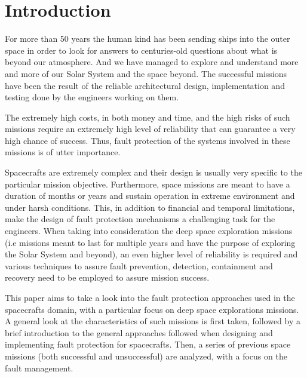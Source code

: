 \section{Introduction}
For more than 50 years the human kind has been sending ships into the outer
space in order to look for answers to centuries-old questions about what is
beyond our atmosphere. And we have managed to explore and understand more and
more of our Solar System and the space beyond. The successful missions have been
the result of the reliable architectural design, implementation and testing done
by the engineers working on them.

The extremely high costs, in both money and time, and the high risks of such
missions require an extremely high level of reliability that can guarantee a
very high chance of success. Thus, fault protection of the systems involved in
these missions is of utter importance.

Spacecrafts are extremely complex and their design is usually very specific to
the particular mission objective. Furthermore, space missions are meant to have
a duration of months or years and sustain operation in extreme environment and
under harsh conditions. This, in addition to financial and temporal limitations,
make the design of fault protection mechanisms a challenging task for the
engineers. When taking into consideration the deep space exploration missions
(i.e missions meant to last for multiple years and have the purpose of exploring
the Solar System and beyond), an even higher level of reliability is required
and various techniques to assure fault prevention, detection, containment and
recovery need to be employed to assure mission success.

This paper aims to take a look into the fault protection approaches used in the
spacecrafts domain, with a particular focus on deep space explorations missions.
A general look at the characteristics of such missions is first taken, followed
by a brief introduction to the general approaches followed when designing and
implementing fault protection for spacecrafts. Then, a series of previous space
missions (both successful and unsuccessful) are analyzed, with a focus on the
fault management.
